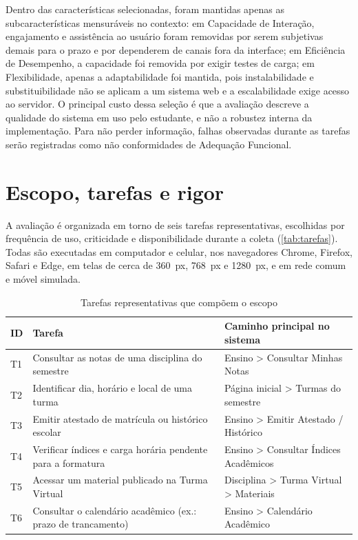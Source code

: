 Dentro das características selecionadas, foram mantidas apenas as subcaracterísticas mensuráveis no contexto: em Capacidade de Interação, engajamento e assistência ao usuário foram removidas por serem subjetivas demais para o prazo e por dependerem de canais fora da interface; em Eficiência de Desempenho, a capacidade foi removida por exigir testes de carga; em Flexibilidade, apenas a adaptabilidade foi mantida, pois instalabilidade e substituibilidade não se aplicam a um sistema web e a escalabilidade exige acesso ao servidor. O principal custo dessa seleção é que a avaliação descreve a qualidade do sistema em uso pelo estudante, e não a robustez interna da implementação. Para não perder informação, falhas observadas durante as tarefas serão registradas como não conformidades de Adequação Funcional.

\section{Escopo, tarefas e rigor}
\label{sec:escopo}

A avaliação é organizada em torno de seis tarefas representativas, escolhidas por frequência de uso, criticidade e disponibilidade durante a coleta (\autoref{tab:tarefas}). Todas são executadas em computador e celular, nos navegadores Chrome, Firefox, Safari e Edge, em telas de cerca de 360~px, 768~px e 1280~px, e em rede comum e móvel simulada.

\begin{table}[htb]
	\caption{Tarefas representativas que compõem o escopo}
	\label{tab:tarefas}
	\centering
	\scriptsize
	\begin{tabularx}{\textwidth}{C{0.6cm} Y L{4.6cm}}
		\toprule
		\textbf{ID} & \textbf{Tarefa} & \textbf{Caminho principal no sistema} \\
		\midrule
		T1 & Consultar as notas de uma disciplina do semestre & Ensino > Consultar Minhas Notas \\
		T2 & Identificar dia, horário e local de uma turma & Página inicial > Turmas do semestre \\
		T3 & Emitir atestado de matrícula ou histórico escolar & Ensino > Emitir Atestado / Histórico \\
		T4 & Verificar índices e carga horária pendente para a formatura & Ensino > Consultar Índices Acadêmicos \\
		T5 & Acessar um material publicado na Turma Virtual & Disciplina > Turma Virtual > Materiais \\
		T6 & Consultar o calendário acadêmico (ex.: prazo de trancamento) & Ensino > Calendário Acadêmico \\
		\bottomrule
	\end{tabularx}
\end{table}

